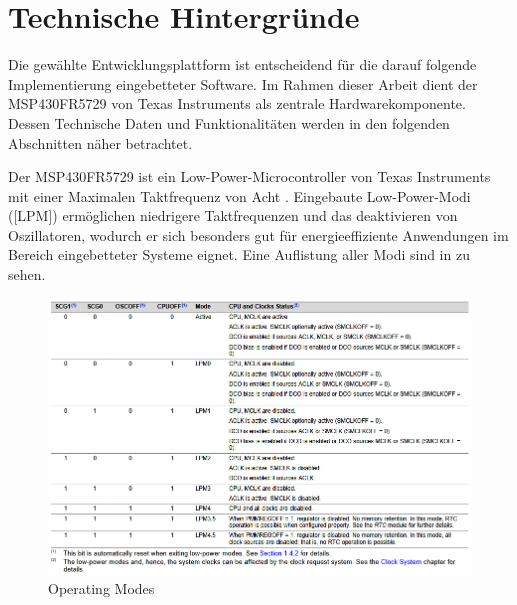 
\chapter{Technische Hintergr\"unde}
\label{sec:UeberblickEntwicklungsplattform}

Die gew\"ahlte Entwicklungsplattform ist entscheidend f\"ur die darauf folgende Implementierung eingebetteter Software. Im Rahmen dieser Arbeit dient der MSP430FR5729 von Texas Instruments als zentrale Hardwarekomponente. Dessen Technische Daten und Funktionalit\"aten werden in den folgenden Abschnitten n\"aher betrachtet.

Der MSP430FR5729 ist ein Low-Power-Microcontroller   von Texas Instruments mit einer Maximalen Taktfrequenz von Acht . Eingebaute Low-Power-Modi ([LPM]) erm\"oglichen \ua niedrigere Taktfrequenzen und das deaktivieren von Oszillatoren, wodurch er sich besonders gut f\"ur energieeffiziente Anwendungen im Bereich eingebetteter Systeme eignet. Eine Auflistung aller Modi sind in  zu sehen. 

\begin{figure}[h!]
	\centering
	\includegraphics[width=1.0\textwidth]{../Bilder/Operating_Modes.png}
	\caption{Operating Modes }
	\label{fig:operation_modes}
\end{figure}

